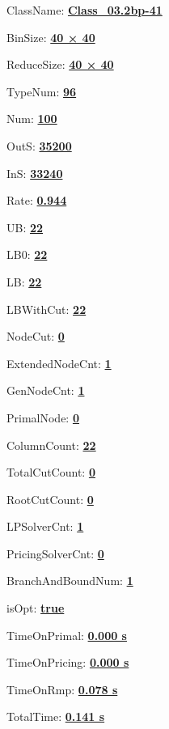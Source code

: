 \documentclass[11pt]{article}
\begin{document}
\pagestyle{empty}


ClassName: \underline{\textbf{Class_03.2bp-41}}
\par
BinSize: \underline{\textbf{40 × 40}}
\par
ReduceSize: \underline{\textbf{40 × 40}}
\par
TypeNum: \underline{\textbf{96}}
\par
Num: \underline{\textbf{100}}
\par
OutS: \underline{\textbf{35200}}
\par
InS: \underline{\textbf{33240}}
\par
Rate: \underline{\textbf{0.944}}
\par
UB: \underline{\textbf{22}}
\par
LB0: \underline{\textbf{22}}
\par
LB: \underline{\textbf{22}}
\par
LBWithCut: \underline{\textbf{22}}
\par
NodeCut: \underline{\textbf{0}}
\par
ExtendedNodeCnt: \underline{\textbf{1}}
\par
GenNodeCnt: \underline{\textbf{1}}
\par
PrimalNode: \underline{\textbf{0}}
\par
ColumnCount: \underline{\textbf{22}}
\par
TotalCutCount: \underline{\textbf{0}}
\par
RootCutCount: \underline{\textbf{0}}
\par
LPSolverCnt: \underline{\textbf{1}}
\par
PricingSolverCnt: \underline{\textbf{0}}
\par
BranchAndBoundNum: \underline{\textbf{1}}
\par
isOpt: \underline{\textbf{true}}
\par
TimeOnPrimal: \underline{\textbf{0.000 s}}
\par
TimeOnPricing: \underline{\textbf{0.000 s}}
\par
TimeOnRmp: \underline{\textbf{0.078 s}}
\par
TotalTime: \underline{\textbf{0.141 s}}
\par
\newpage


\end{document}
